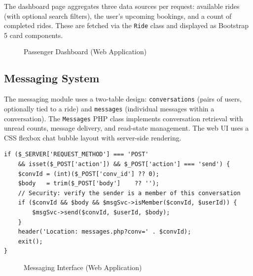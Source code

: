 \documentclass[12pt,a4paper,openright]{report}
\begin{document}
The dashboard page aggregates three data sources per request: available rides (with optional search filters), the user's upcoming bookings, and a count of completed rides. These are fetched via the \texttt{Ride} class and displayed as Bootstrap 5 card components.

\begin{figure}[H]
\centering
{}
\caption{Passenger Dashboard (Web Application)}
\label{fig:web-dashboard}
\end{figure}

\subsection{Messaging System}

The messaging module uses a two-table design: \texttt{conversations} (pairs of users, optionally tied to a ride) and \texttt{messages} (individual messages within a conversation). The \texttt{Messages} PHP class implements conversation retrieval with unread counts, message delivery, and read-state management. The web UI uses a CSS flexbox chat bubble layout with server-side rendering.

\begin{lstlisting}[style=phpstyle, caption={Send Message Handler in messages.php}]
if ($_SERVER['REQUEST_METHOD'] === 'POST'
    && isset($_POST['action']) && $_POST['action'] === 'send') {
    $convId = (int)($_POST['conv_id'] ?? 0);
    $body   = trim($_POST['body']    ?? '');
    // Security: verify the sender is a member of this conversation
    if ($convId && $body && $msgSvc->isMember($convId, $userId)) {
        $msgSvc->send($convId, $userId, $body);
    }
    header('Location: messages.php?conv=' . $convId);
    exit();
}
\end{lstlisting}

\begin{figure}[H]
\centering
{}
\caption{Messaging Interface (Web Application)}
\label{fig:web-messages}
\end{figure}
\end{document}
